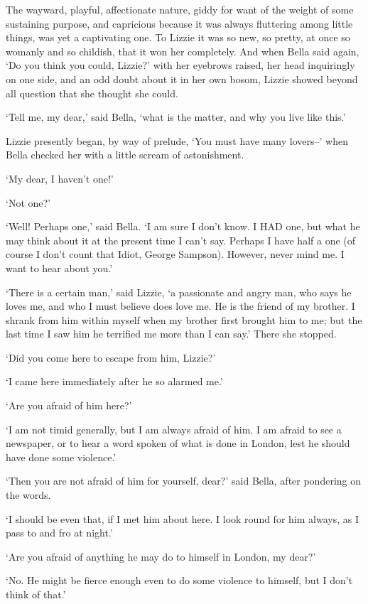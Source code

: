 The wayward, playful, affectionate nature, giddy for want of the
weight of some sustaining purpose, and capricious because it was always
fluttering among little things, was yet a captivating one. To Lizzie it
was so new, so pretty, at once so womanly and so childish, that it won
her completely. And when Bella said again, ‘Do you think you could,
Lizzie?’ with her eyebrows raised, her head inquiringly on one side,
and an odd doubt about it in her own bosom, Lizzie showed beyond all
question that she thought she could.

‘Tell me, my dear,’ said Bella, ‘what is the matter, and why you live
like this.’

Lizzie presently began, by way of prelude, ‘You must have many lovers--’
when Bella checked her with a little scream of astonishment.

‘My dear, I haven’t one!’

‘Not one?’

‘Well! Perhaps one,’ said Bella. ‘I am sure I don’t know. I HAD one, but
what he may think about it at the present time I can’t say. Perhaps I
have half a one (of course I don’t count that Idiot, George Sampson).
However, never mind me. I want to hear about you.’

‘There is a certain man,’ said Lizzie, ‘a passionate and angry man, who
says he loves me, and who I must believe does love me. He is the friend
of my brother. I shrank from him within myself when my brother first
brought him to me; but the last time I saw him he terrified me more than
I can say.’ There she stopped.

‘Did you come here to escape from him, Lizzie?’

‘I came here immediately after he so alarmed me.’

‘Are you afraid of him here?’

‘I am not timid generally, but I am always afraid of him. I am afraid
to see a newspaper, or to hear a word spoken of what is done in London,
lest he should have done some violence.’

‘Then you are not afraid of him for yourself, dear?’ said Bella, after
pondering on the words.

‘I should be even that, if I met him about here. I look round for him
always, as I pass to and fro at night.’

‘Are you afraid of anything he may do to himself in London, my dear?’

‘No. He might be fierce enough even to do some violence to himself, but
I don’t think of that.’

